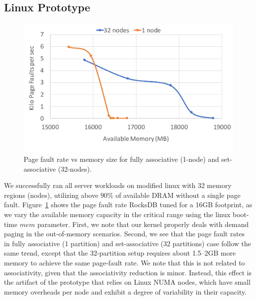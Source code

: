 \subsection{Linux Prototype}
\begin{figure}[t]
   \centering
   \includegraphics[width=1.0\columnwidth]{graphs/realhw.pdf}
   \caption{Page fault rate vs memory size for fully associative (1-node) and set-associative (32-nodes).}
   \label{fig:realhw}
\end{figure}
We successfully ran all server workloads on modified linux with 32 memory regions (nodes), utilizing above 90\% of available DRAM without a single page fault. Figure~\ref{fig:realhw} shows the page fault rate RocksDB tuned for a 16GB footprint, as we vary the available memory capacity in the critical range using the linux boot-time $mem$ parameter. First, we note that our kernel properly deals with demand paging in the out-of-memory scenarios. Second, we see that the page fault rates in fully associative (1 partition) and set-associative (32 partitions) case follow the same trend, except that the 32-partition setup requires about 1.5--2GB more memory to achieve the same page-fault rate. We note that this is not related to associativity, given that the associativity reduction is minor. Instead, this effect is the artifact of the prototype that relies on Linux NUMA nodes, which have small memory overheads per node and exhibit a degree of variability in their capacity. 



